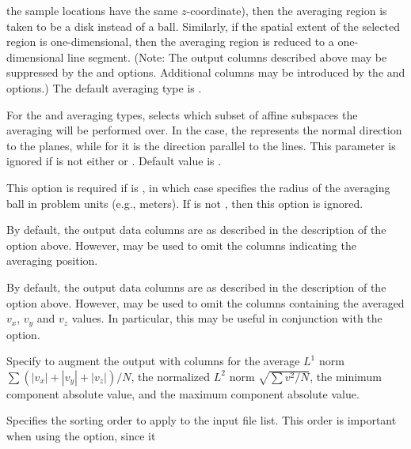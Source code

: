 \begin{description}
  the sample locations have the same $z$-coordinate), then the
  averaging region is taken to be a disk instead of a ball.
  Similarly, if the spatial extent of the selected region is
  one-dimensional, then the averaging region is reduced to a
  one-dimensional line segment.  (Note: The output columns described
  above may be suppressed by the  and
   options.  Additional columns may be introduced by
  the  and  options.)  The default averaging
  type is .
\item[\optkey{-axis \boa x\pipe y\pipe z\bca}]
  For the  and  averaging types,
  selects which subset of affine subspaces the averaging will be
  performed over.  In the  case, the  represents
  the normal direction to the planes, while for  it is the
  direction parallel to the lines.  This parameter is ignored if
   is not either  or .  Default value
  is .
\item[\optkey{-ball\_radius brad}]
  This option is required if  is , in which case
   specifies the radius of the averaging ball in problem
  units (e.g., meters).  If   is not , then this
  option is ignored.
\item[\optkey{-defaultpos \boa 0\pipe 1\bca}]
  By default, the output data columns are as described in the
  description of the  option above.  However,
   may be used to omit the columns indicating the
  averaging position.
\item[\optkey{-defaultvals \boa 0\pipe 1\bca}]
  By default, the output data columns are as described in the
  description of the  option above.  However,
   may be used to omit the columns containing the
  averaged $v_x$, $v_y$ and $v_z$ values.  In particular, this may be
  useful in conjunction with the  option.
\item[\optkey{-extravals \boa 0\pipe 1\bca}]
  Specify  to augment the output with columns
  for the average $L^1$ norm
  $\sum\left(|v_x| + |v_y| + |v_z|\right)/N$, the normalized $L^2$
  norm $\sqrt{\sum v^2/N}$, the minimum component absolute value,
  and the maximum component absolute value.
\item[\optkey{-filesort method}]
  Specifies the sorting order to apply to the input file list.  This
  order is important when using the  option, since it

\end{description}
